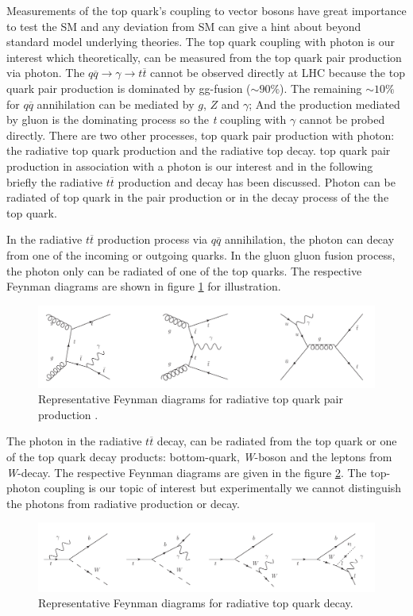 Measurements of the top quark's coupling to vector bosons have great importance to test the SM and any deviation from SM can give a hint about beyond standard model underlying theories. The top quark coupling with photon is our interest which theoretically, can be measured from the top quark pair production via photon. The $q\overline{q} \rightarrow \gamma \rightarrow t\overline{t}$ cannot be observed directly at LHC because the top quark pair production is dominated by gg-fusion ($\sim90\%$). The remaining $\sim10\%$ for $q\overline{q}$ annihilation can be mediated by $g$, $Z$ and $\gamma$; And the production mediated by gluon is the dominating process so the \textit{t} coupling with $\gamma$ cannot be probed directly. There are two other processes, top quark pair production with photon: the radiative top quark production and the radiative top decay. top quark pair production in association with a photon is our interest and in the following briefly the radiative $t\overline{t}$ production and decay has been discussed. Photon can be radiated of top quark in the pair production or in the decay process of the the top quark.

In the radiative $t\overline{t}$ production process via $q\overline{q}$ annihilation, the photon can decay from one of the incoming or outgoing quarks. In the gluon gluon fusion process, the photon only can be radiated of one of the top quarks. The respective Feynman diagrams are shown in figure \ref{fig:feynmanttgamma1} for illustration.

\begin{figure}[H]
\centering
\includegraphics[width=14cm]{Figures/ttgamma_production.png}
\decoRule
\caption{Representative Feynman diagrams for radiative top quark pair production \cite{borathesis1}.}
\label{fig:feynmanttgamma1}
\end{figure}

The photon in the radiative $t\overline{t}$ decay, can be radiated from the top quark or one of the top quark decay products: bottom-quark, \textit{W}-boson and the leptons from \textit{W}-decay. The respective Feynman diagrams are given in the figure \ref{fig:feynmanttgamma2}. The top-photon coupling is our topic of interest but experimentally we cannot distinguish the photons from radiative production or decay.

\begin{figure}[H]
\centering
\includegraphics[width=14cm]{Figures/ttgamma_decay.png}
\decoRule
\caption{Representative Feynman diagrams for radiative top quark decay\cite{borathesis1}.}
\label{fig:feynmanttgamma2}
\end{figure}
